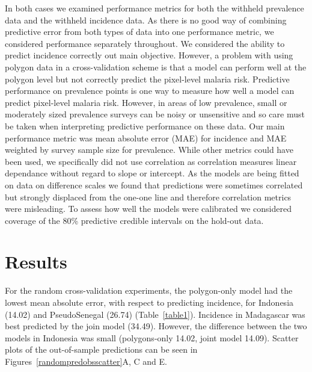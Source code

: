 \documentclass[10pt,letterpaper]{article}
\begin{document}
In both cases we examined performance metrics for both the withheld prevalence data and the withheld incidence data.
As there is no good way of combining predictive error from both types of data into one performance metric, we considered performance separately throughout.
We considered the ability to predict incidence correctly out main objective.
However, a problem with using polygon data in a cross-validation scheme is that a model can perform well at the polygon level but not correctly predict the pixel-level malaria risk.
Predictive performance on prevalence points is one way to measure how well a model can predict pixel-level malaria risk.
However, in areas of low prevalence, small or moderately sized prevalence surveys can be noisy or unsensitive and so care must be taken when interpreting predictive performance on these data.
Our main performance metric was mean absolute error (MAE) for incidence and MAE weighted by survey sample size for prevalence.
While other metrics could have been used, we specifically did not use correlation as correlation measures linear dependance without regard to slope or intercept.
As the models are being fitted on data on difference scales we found that predictions were sometimes correlated but strongly displaced from the one-one line and therefore correlation metrics were misleading.
To assess how well the models were calibrated we considered coverage of the 80\% predictive credible intervals on the hold-out data.



\section*{Results}



For the random cross-validation experiments, the polygon-only model had the lowest mean absolute error, with respect to predicting incidence, for Indonesia (14.02) and PseudoSenegal (26.74) (Table~\ref{table1}).
Incidence in Madagascar was best predicted by the join model (34.49).
However, the difference between the two models in Indonesia was small (polygons-only 14.02, joint model 14.09).
Scatter plots of the out-of-sample predictions can be seen in Figures~\ref{randompredobsscatter}A, C and E.
\end{document}
